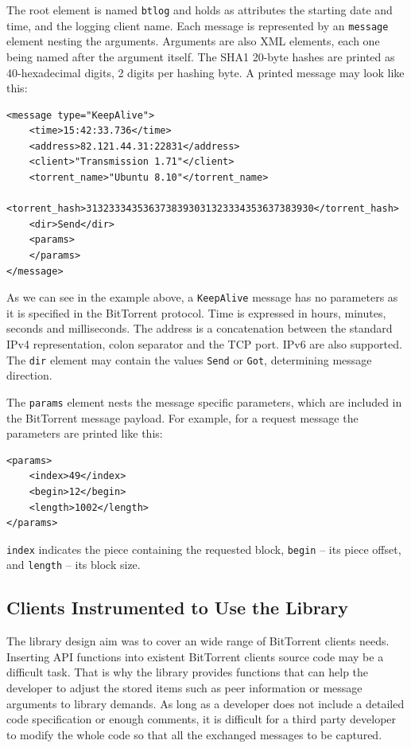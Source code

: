 The root element is named \texttt{btlog} and holds as attributes the starting
date and time, and the logging client name. Each message is represented by an
\texttt{message} element nesting the arguments. Arguments are also XML
elements, each one being named after the argument itself. The SHA1 20-byte
hashes are printed as 40-hexadecimal digits, 2 digits per hashing byte. A
printed  message may look like this:

\lstset{language=XML,caption=XML Output
Message,label=lst:proto-measure:xml-message}
\begin{lstlisting}
<message type="KeepAlive">
    <time>15:42:33.736</time>
    <address>82.121.44.31:22831</address>
    <client>"Transmission 1.71"</client>
    <torrent_name>"Ubuntu 8.10"</torrent_name>
    <torrent_hash>3132333435363738393031323334353637383930</torrent_hash>
    <dir>Send</dir>
    <params>
    </params>
</message>
\end{lstlisting}

As we can see in the example above, a \texttt{KeepAlive} message has no
parameters as it is specified in the BitTorrent protocol. Time is expressed in
hours, minutes, seconds and milliseconds. The address is a concatenation
between the standard IPv4 representation, colon separator and the TCP port.
IPv6 are also supported. The \texttt{dir} element may contain the values
\texttt{Send} or \texttt{Got}, determining message direction.

The \texttt{params} element nests the message specific parameters, which are
included in the BitTorrent message payload. For example, for a request message
the parameters are printed like this:

\lstset{language=XML,caption=params Element in XML Output
Message,label=lst:proto-measure:xml-params}
\begin{lstlisting}
<params>
    <index>49</index>
    <begin>12</begin>
    <length>1002</length>
</params>
\end{lstlisting}

\texttt{index} indicates the piece containing the requested block,
\texttt{begin} -- its piece offset, and \texttt{length} -- its block size.

\subsection{Clients Instrumented to Use the Library}

The library design aim was to cover an wide range of BitTorrent clients needs.
Inserting API functions into existent BitTorrent clients source code may be a
difficult task. That is why the library provides functions that can help the
developer to adjust the stored items such as peer information or  message
arguments to library demands. As long as a developer does not include a
detailed code specification or enough comments, it is difficult for a third
party developer to modify the whole code so that all the exchanged messages to
be captured.

